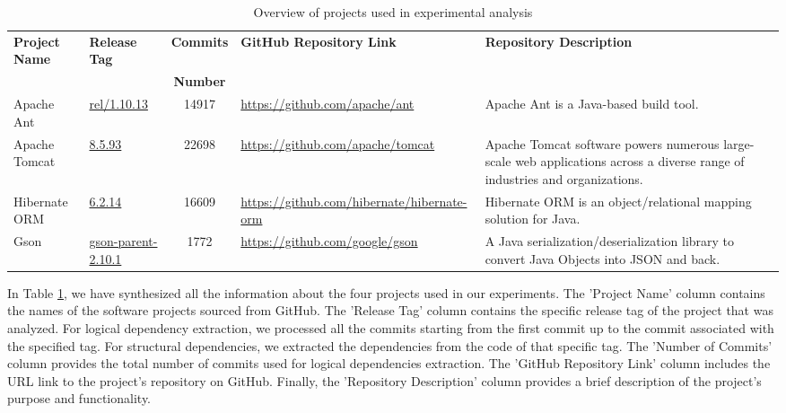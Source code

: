 \documentclass{ieeeaccess}
\begin{document}
\begin{table}
\centering
\caption{Overview of projects used in experimental analysis}
\label{tab:project_info}
\setlength{\tabcolsep}{7pt} 
\begin{tabular}{|l|l|c|l|p{4.7cm}|}
\hline
\textbf{Project Name} & \textbf{Release Tag} & \textbf{Commits} & \textbf{GitHub Repository Link} & \textbf{Repository Description} \\ 
 &  & \textbf{Number} & &  \\ \hline
Apache Ant & \href{https://github.com/apache/ant/tree/rel/1.10.13}{rel/1.10.13} & 14917 & \href{https://github.com/apache/ant}{https://github.com/apache/ant} & Apache Ant is a Java-based build tool. \\ \hline
Apache Tomcat & \href{https://github.com/apache/tomcat/tree/8.5.93}{8.5.93} & 22698 & \href{https://github.com/apache/tomcat}{https://github.com/apache/tomcat} & Apache Tomcat software powers numerous large-scale web applications across a diverse range of industries and organizations. \\ \hline
Hibernate ORM & \href{https://github.com/hibernate/hibernate-orm/tree/6.2.14}{6.2.14} & 16609 & \href{https://github.com/hibernate/hibernate-orm}{https://github.com/hibernate/hibernate-orm} & Hibernate ORM is an object/relational mapping solution for Java. \\ \hline
Gson & \href{https://github.com/google/gson/tree/gson-parent-2.10.1}{gson-parent-2.10.1} & 1772 & \href{https://github.com/google/gson}{https://github.com/google/gson} & A Java serialization/deserialization library to convert Java Objects into JSON and back. \\ \hline
\end{tabular}
\end{table}

In Table \ref{tab:project_info}, we have synthesized all the information about the four projects used in our experiments. The 'Project Name' column contains the names of the software projects sourced from GitHub. The 'Release Tag' column contains the specific release tag of the project that was analyzed. For logical dependency extraction, we processed all the commits starting from the first commit up to the commit associated with the specified tag. For structural dependencies, we extracted the dependencies from the code of that specific tag. The 'Number of Commits' column provides the total number of commits used for logical dependencies extraction. The 'GitHub Repository Link' column includes the URL link to the project's repository on GitHub. Finally, the 'Repository Description' column provides a brief description of the project's purpose and functionality.
\end{document}
